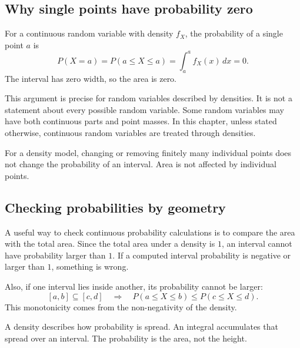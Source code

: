 \subsection*{Why single points have probability zero}

For a continuous random variable with density \(f_X\), the probability of a
single point \(a\) is
\[
P(X=a)=P(a\leq X\leq a)=\int_a^a f_X(x)\,dx=0.
\]
The interval has zero width, so the area is zero.

This argument is precise for random variables described by densities. It is not
a statement about every possible random variable. Some random variables may have
both continuous parts and point masses. In this chapter, unless stated
otherwise, continuous random variables are treated through densities.

\begin{remarkbox}
For a density model, changing or removing finitely many individual points does
not change the probability of an interval. Area is not affected by individual
points.
\end{remarkbox}

\subsection*{Checking probabilities by geometry}

A useful way to check continuous probability calculations is to compare the area
with the total area. Since the total area under a density is \(1\), an interval
cannot have probability larger than \(1\). If a computed interval probability is
negative or larger than \(1\), something is wrong.

Also, if one interval lies inside another, its probability cannot be larger:
\[
[a,b]\subseteq[c,d]
\quad\Longrightarrow\quad
P(a\leq X\leq b)\leq P(c\leq X\leq d).
\]
This monotonicity comes from the non-negativity of the density.

\begin{summarybox}
A density describes how probability is spread. An integral accumulates that
spread over an interval. The probability is the area, not the height.
\end{summarybox}
